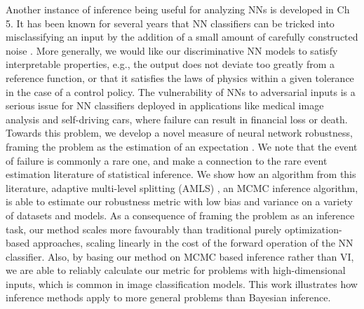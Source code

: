Another instance of inference being useful for analyzing NNs is developed in Ch 5. It has been known for several years that NN classifiers can be tricked into misclassifying an input by the addition of a small amount of carefully constructed noise \citep{szegedy2013intriguing}. More generally, we would like our discriminative NN models to satisfy interpretable properties, e.g., the output does not deviate too greatly from a reference function, or that it satisfies the laws of physics within a given tolerance in the case of a control policy. The vulnerability of NNs to adversarial inputs is a serious issue for NN classifiers deployed in applications like medical image analysis and self-driving cars, where failure can result in financial loss or death. Towards this problem, we develop a novel measure of neural network robustness, framing the problem as the estimation of an expectation \citep{webb2018statistical}. We note that the event of failure is commonly a rare one, and make a connection to the rare event estimation literature of statistical inference. We show how an algorithm from this literature, adaptive multi-level splitting (AMLS) \citep{guyader2011simulation}, an MCMC inference algorithm, is able to estimate our robustness metric with low bias and variance on a variety of datasets and models. As a consequence of framing the problem as an inference task, our method scales more favourably than traditional purely optimization-based approaches, scaling linearly in the cost of the forward operation of the NN classifier. Also, by basing our method on MCMC based inference rather than VI, we are able to reliably calculate our metric for problems with high-dimensional inputs, which is common in image classification models. This work illustrates how inference methods apply to more general problems than Bayesian inference.







